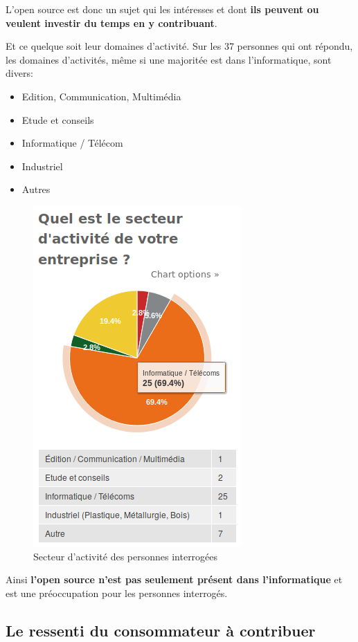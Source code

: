 			L'open source est donc un sujet qui les intéresses et dont \textbf{ils peuvent ou veulent investir du temps en y contribuant}.

			Et ce quelque soit leur domaines d'activité. Sur les 37 personnes qui ont répondu, les domaines d'activités, même si une majoritée est dans l'informatique, sont divers:

			\begin{itemize}[label=\textbullet, font=\LARGE \color{burntorange}]
				\item Edition, Communication, Multimédia
				\item Etude et conseils
				\item Informatique / Télécom
				\item Industriel
				\item Autres
			\end{itemize}

			\begin{figure}[!htb]
				\center
				\includegraphics[scale=0.58]{./img/a1}
				\caption{Secteur d'activité des personnes interrogées}
			\end{figure}

			Ainsi \textbf{l'open source n'est pas seulement présent dans l'informatique} et est une préoccupation pour les personnes interrogés.


		\subsection{Le ressenti du consommateur à contribuer}

